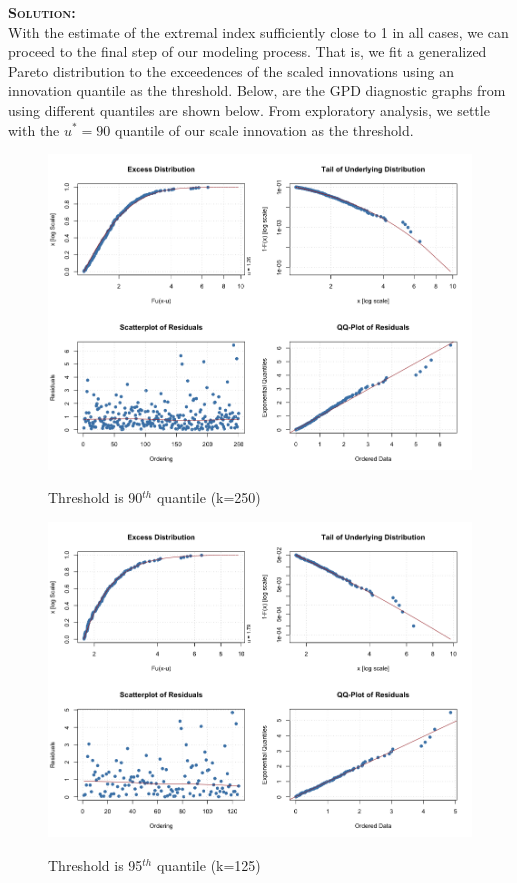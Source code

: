 \documentclass[12pt,oneside]{article}
\newenvironment{solution}
    {\textbf{\textsc{Solution:}}\\}
    {\newpage}
\begin{document}
\begin{solution}
With the estimate of the extremal index sufficiently close to 1 in all cases, we can proceed to the final step of our modeling process. That is, we fit a generalized Pareto distribution to the exceedences of the scaled innovations using an innovation quantile as the threshold. Below, are the GPD diagnostic graphs from using different quantiles are shown below. From exploratory analysis, we settle with the $u^*=90$ quantile of our scale innovation as the threshold.
\begin{figure}[H]
\begin{center}
{\includegraphics[width=4.5in]{Assignments/a4/90quant-days-gp.png}}
\caption{Threshold is 90$^{th}$ quantile (k=250)}
\end{center}
\end{figure}

\begin{figure}[H]
\begin{center}
{\includegraphics[width=4.5in]{Assignments/a4/95quant-days-gp.png}}
\caption{Threshold is 95$^{th}$ quantile (k=125)}
\end{center}
\end{figure}


\end{solution}
\end{document}

